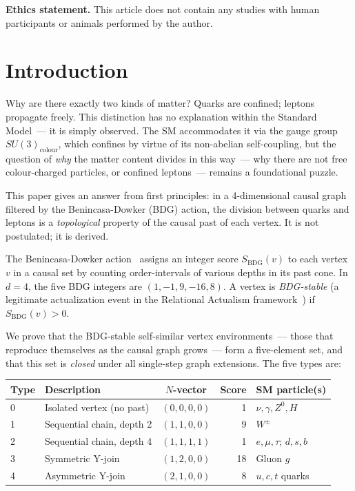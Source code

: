 \documentclass[11pt,a4paper]{article}
\newcommand{\SBDG}{S_{\mathrm{BDG}}}
\begin{document}
\medskip
\noindent\textbf{Ethics statement.}
This article does not contain any studies with human participants
or animals performed by the author.



\section{Introduction}
\label{sec:intro}

Why are there exactly two kinds of matter? Quarks are confined; leptons
propagate freely. This distinction has no explanation within the Standard
Model~--- it is simply observed. The SM accommodates it via the gauge
group $SU(3)_{\mathrm{colour}}$, which confines by virtue of its
non-abelian self-coupling, but the question of \emph{why} the matter
content divides in this way~--- why there are not free colour-charged
particles, or confined leptons~--- remains a foundational puzzle.

This paper gives an answer from first principles: in a 4-dimensional
causal graph filtered by the Benincasa-Dowker (BDG) action, the division
between quarks and leptons is a \emph{topological} property of the
causal past of each vertex. It is not postulated; it is derived.

The Benincasa-Dowker action~\citep{Benincasa2010,Dowker2013} assigns an
integer score $\SBDG(v)$ to each vertex $v$ in a causal set by counting
order-intervals of various depths in its past cone. In $d=4$, the five
BDG integers are $(1,-1,9,-16,8)$. A vertex is \emph{BDG-stable}
(a legitimate actualization event in the Relational Actualism
framework~\citep{Sandeman2026RAQM}) if $\SBDG(v) > 0$.

We prove that the BDG-stable self-similar vertex environments~--- those
that reproduce themselves as the causal graph grows~--- form a
five-element set, and that this set is \emph{closed} under all
single-step graph extensions. The five types are:

\begin{center}
\renewcommand{\arraystretch}{1.25}
\begin{tabular}{llcrl}
\toprule
Type & Description & $N$-vector & Score & SM particle(s) \\
\midrule
0 & Isolated vertex (no past) & $(0,0,0,0)$ & 1 & $\nu,\gamma,Z^0,H$ \\
1 & Sequential chain, depth 2 & $(1,1,0,0)$ & 9 & $W^{\pm}$ \\
2 & Sequential chain, depth 4 & $(1,1,1,1)$ & 1 & $e,\mu,\tau$; $d,s,b$ \\
3 & Symmetric Y-join & $(1,2,0,0)$ & 18 & Gluon $g$ \\
4 & Asymmetric Y-join & $(2,1,0,0)$ & 8 & $u,c,t$ quarks \\
\bottomrule
\end{tabular}
\end{center}
\end{document}
